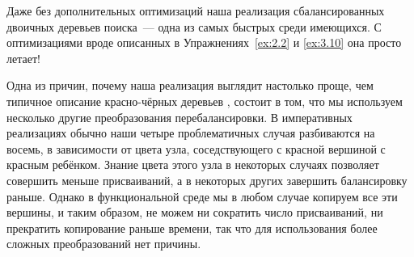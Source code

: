 \begin{frame}[fragile]{}
\begin{figure}[h]
  \centering
  
  \label{fig:3.5}
\end{figure}
\end{frame}

\begin{frame}[fragile]{}
\begin{figure}[h]
  \centering
  
  \label{fig:3.5.2}
\end{figure}
\end{frame}

\begin{frame}[fragile]{}
\begin{hint}
  Даже без дополнительных оптимизаций наша реализация сбалансированных
  двоичных деревьев поиска~--- одна из самых быстрых среди
  имеющихся. С оптимизациями вроде описанных в
  Упражнениях~\ref{ex:2.2} и \ref{ex:3.10} она просто летает!
\end{hint}
\end{frame}


\begin{frame}[fragile]{}
\begin{remark}
  Одна из причин, почему наша реализация выглядит настолько проще, чем
  типичное описание красно-чёрных деревьев 
  , состоит в том, что мы
  используем несколько другие преобразования перебалансировки. В
  императивных реализациях обычно наши четыре проблематичных случая
  разбиваются на восемь, в зависимости от цвета узла, соседствующего с
  красной вершиной с красным ребёнком.  Знание цвета этого узла в
  некоторых случаях позволяет совершить меньше присваиваний, а в
  некоторых других завершить балансировку раньше. Однако в
  функциональной среде мы в любом случае копируем все эти вершины, и
  таким образом, не можем ни сократить число присваиваний, ни
  прекратить копирование раньше времени, так что для использования
  более сложных преобразований нет причины.
\end{remark}

\end{frame}


